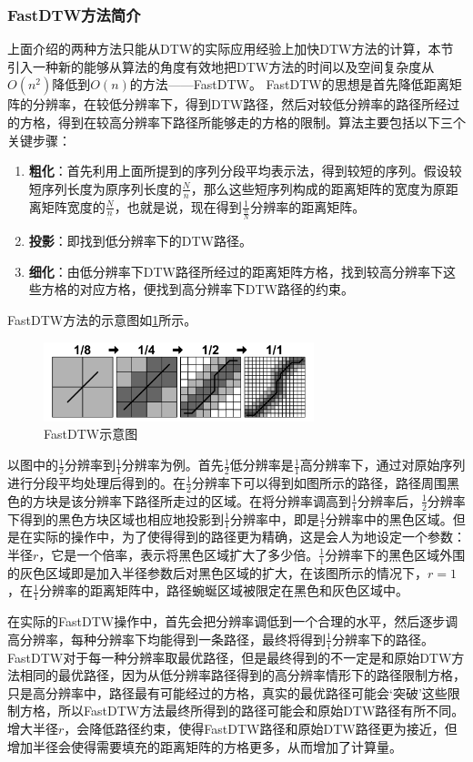 \subsubsection{FastDTW方法简介}
上面介绍的两种方法只能从DTW的实际应用经验上加快DTW方法的计算，本节引入一种新的能够从算法的角度有效地把DTW方法的时间以及空间复杂度从$O(n^2)$降低到$O(n)$的方法——FastDTW\cite{Salvador2007}。
FastDTW的思想是首先降低距离矩阵的分辨率，在较低分辨率下，得到DTW路径，然后对较低分辨率的路径所经过的方格，得到在较高分辨率下路径所能够走的方格的限制。算法主要包括以下三个关键步骤：
\begin{enumerate}
  \item \textbf{粗化}：首先利用上面所提到的序列分段平均表示法，得到较短的序列。假设较短序列长度为原序列长度的$\frac{N}{n}$，那么这些短序列构成的距离矩阵的宽度为原距离矩阵宽度的$\frac{N}{n}$，也就是说，现在得到$\frac{1}{\frac{n}{N}}$分辨率的距离矩阵。
  \item \textbf{投影}：即找到低分辨率下的DTW路径。
  \item \textbf{细化}：由低分辨率下DTW路径所经过的距离矩阵方格，找到较高分辨率下这些方格的对应方格，便找到高分辨率下DTW路径的约束。
\end{enumerate}
FastDTW方法的示意图如\ref{fig:10}所示。
\begin{figure}[h]
  \centering
  \includegraphics[width=0.7\textwidth]{./figure/FastDTW.PNG}
  \caption{FastDTW示意图}\label{fig:10}
\end{figure}

以图中的$\frac{1}{2}$分辨率到$\frac{1}{1}$分辨率为例。首先$\frac{1}{2}$低分辨率是$\frac{1}{1}$高分辨率下，通过对原始序列进行分段平均处理后得到的。在$\frac{1}{2}$分辨率下可以得到如图所示的路径，路径周围黑色的方块是该分辨率下路径所走过的区域。在将分辨率调高到$\frac{1}{1}$分辨率后，$\frac{1}{2}$分辨率下得到的黑色方块区域也相应地投影到$\frac{1}{1}$分辨率中，即是$\frac{1}{1}$分辨率中的黑色区域。但是在实际的操作中，为了使得得到的路径更为精确，这是会人为地设定一个参数：半径$r$，它是一个倍率，表示将黑色区域扩大了多少倍。$\frac{1}{1}$分辨率下的黑色区域外围的灰色区域即是加入半径参数后对黑色区域的扩大，在该图所示的情况下，$r=1$，在$\frac{1}{1}$分辨率的距离矩阵中，路径蜿蜒区域被限定在黑色和灰色区域中。

在实际的FastDTW操作中，首先会把分辨率调低到一个合理的水平，然后逐步调高分辨率，每种分辨率下均能得到一条路径，最终将得到$\frac{1}{1}$分辨率下的路径。FastDTW对于每一种分辨率取最优路径，但是最终得到的不一定是和原始DTW方法相同的最优路径，因为从低分辨率路径得到的高分辨率情形下的路径限制方格，只是高分辨率中，路径最有可能经过的方格，真实的最优路径可能会‘突破’这些限制方格，所以FastDTW方法最终所得到的路径可能会和原始DTW路径有所不同。增大半径$r$，会降低路径约束，使得FastDTW路径和原始DTW路径更为接近，但增加半径会使得需要填充的距离矩阵的方格更多，从而增加了计算量。

